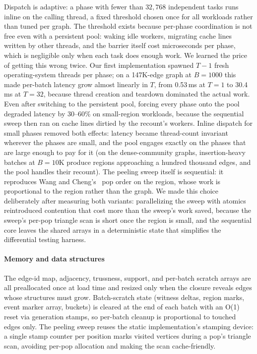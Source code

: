 Dispatch is adaptive: a phase with fewer than $32{,}768$ independent tasks runs inline on the calling thread, a fixed threshold chosen once for all workloads rather than tuned per graph.
The threshold exists because per-phase coordination is not free even with a persistent pool: waking idle workers, migrating cache lines written by other threads, and the barrier itself cost microseconds per phase, which is negligible only when each task does enough work.
We learned the price of getting this wrong twice.
Our first implementation spawned $T{-}1$ fresh operating-system threads per phase; on a 147K-edge graph at $B{=}1000$ this made per-batch latency grow almost linearly in $T$, from 0.53\,ms at $T{=}1$ to 30.4\,ms at $T{=}32$, because thread creation and teardown dominated the actual work.
Even after switching to the persistent pool, forcing every phase onto the pool degraded latency by 30--60\% on small-region workloads, because the sequential sweep then ran on cache lines dirtied by the recount's workers.
Inline dispatch for small phases removed both effects: latency became thread-count invariant wherever the phases are small, and the pool engages exactly on the phases that are large enough to pay for it (on the dense-community graphs, insertion-heavy batches at $B{=}10$K produce regions approaching a hundred thousand edges, and the pool handles their recount).
The peeling sweep itself is sequential: it reproduces Wang and Cheng's~\cite{wang2012truss} pop order on the region, whose work is proportional to the region rather than the graph.
We made this choice deliberately after measuring both variants: parallelizing the sweep with atomics reintroduced contention that cost more than the sweep's work saved, because the sweep's per-pop triangle scan is short once the region is small, and the sequential core leaves the shared arrays in a deterministic state that simplifies the differential testing harness.

\paragraph{Memory and data structures}
The edge-id map, adjacency, trussness, support, and per-batch scratch arrays are all preallocated once at load time and resized only when the closure reveals edges whose structures must grow.
Batch-scratch state (witness deltas, region marks, event marker array, buckets) is cleared at the end of each batch with an O(1) reset via generation stamps, so per-batch cleanup is proportional to touched edges only.
The peeling sweep reuses the static implementation's stamping device: a single stamp counter per position marks visited vertices during a pop's triangle scan, avoiding per-pop allocation and making the scan cache-friendly.

